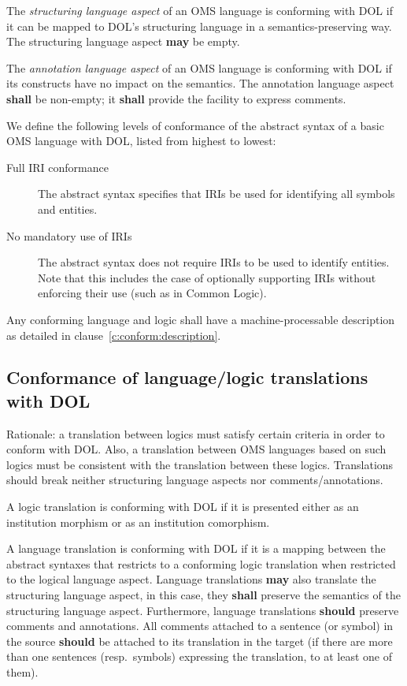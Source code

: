 \documentclass[10pt,fleqn,%
\ifpretendfinal
final%
\else
draft%
\fi,
]{scrreprt}
\newcommand*{\shall}{\textbf{shall}\xspace}
\newcommand*{\should}{\textbf{should}\xspace}
\newcommand*{\may}{\textbf{may}\xspace}
\newcommand{\clauserefname}{clause}
\newcommand{\cref}[1]{\clauserefname~\ref{#1}}
\newcommand{\ssclause}[1]{\subsection{#1}}
\begin{document}
The \emph{structuring language aspect} of an OMS language is conforming with DOL if it can be
mapped to DOL's structuring language in a semantics-preserving way. The structuring language aspect
\may be empty.

The \emph{annotation language aspect} of an OMS language is conforming with DOL if its constructs
have no impact on the semantics. The annotation language aspect \shall be non-empty; it \shall
provide the facility to express comments.

We define the following levels of conformance of the abstract syntax of a basic
 OMS language with DOL, listed from highest to lowest:

\begin{description}
\item[Full IRI conformance] The abstract syntax specifies that IRIs be used for
 identifying all symbols and entities.
\item[No mandatory use of IRIs] The abstract syntax does not require  IRIs
 to be used to identify entities. Note that this includes the case of
  optionally supporting IRIs without enforcing their use (such as in Common
  Logic).
\end{description}

Any conforming language and logic shall have a machine-processable description
 as detailed in \cref{c:conform:description}.

\ssclause{Conformance of language/logic translations with DOL}\label{c:conform:translation}

Rationale: a translation between logics must satisfy certain criteria in order to conform with DOL.
Also, a translation between OMS languages based on such logics must be consistent with the
translation between these logics.  Translations should break neither structuring language aspects nor comments/annotations.


A logic translation is conforming with DOL if it is presented either as an institution morphism or
as an institution comorphism.  

A language translation is conforming with DOL if it is a mapping
between the abstract syntaxes that restricts to a conforming logic
translation when restricted to the logical language aspect. Language
translations \may also translate the structuring language aspect, in
this case, they \shall preserve the semantics of the structuring
language aspect.  Furthermore, language translations \should preserve
comments and annotations.  All comments attached to a sentence (or
symbol) in the source \should be attached to its translation in the
target (if there are more than one sentences (resp.\ symbols)
expressing the translation, to at least one of them).
\end{document}
